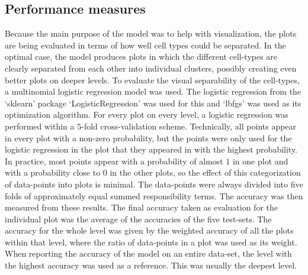 \subsection{Performance measures}\label{sec:performance_measures}
Because the main purpose of the model was to help with visualization, the plots are being evaluated in terms of how well cell types could be separated. In the optimal case, the model produces plots in which the different cell-types are clearly separated from each other into individual clusters, possibly creating even better plots on deeper levels. To evaluate the visual separability of the cell-types, a multinomial logistic regression model was used. The logistic regression from the `sklearn' package `LogisticRegression' was used for this and `lbfgs' was used as its optimization algorithm. For every plot on every level, a logistic regression was performed within a $5$-fold cross-validation scheme. Technically, all points appear in every plot with a non-zero probability, but the points were only used for the logistic regression in the plot that they appeared in with the highest probability. In practice, most points appear with a probability of almost $1$ in one plot and with a probability close to $0$ in the other plots, so the effect of this categorization of data-points into plots is minimal. The data-points were always divided into five folds of approximately equal summed responsibility terms. The accuracy was then measured from these results. The final accuracy taken as evaluation for the individual plot was the average of the accuracies of the five test-sets. The accuracy for the whole level was given by the weighted accuracy of all the plots within that level, where the ratio of data-points in a plot was used as its weight.
When reporting the accuracy of the model on an entire data-set, the level with the highest accuracy was used as a reference. This was usually the deepest level.


